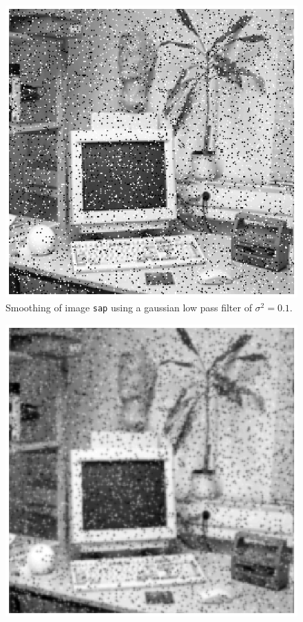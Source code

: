 \begin{minipage}{\linewidth}
  \begin{minipage}{0.4\linewidth}
    \begin{figure}[H]
      \includegraphics[scale=0.6]{./images/Q17/discgaussfft/sap_01.eps}
      \caption{Smoothing of image \texttt{sap} using a gaussian low pass filter of $\sigma^2 = 0.1$.}
      \label{fig:Q17_discgaussfft_sap_01}
    \end{figure}
  \end{minipage}
  \hspace{0.05\linewidth}
  \begin{minipage}{0.4\linewidth}
    \begin{figure}[H]
      \includegraphics[scale=0.6]{./images/Q17/discgaussfft/sap_1.eps}

\end{figure}
\end{minipage}
\end{minipage}
